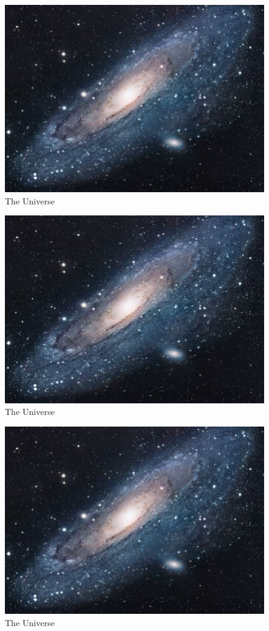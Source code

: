 \documentclass{article}
\begin{document}
\begin{figure}[h!]
\centering
\includegraphics[scale=1.7]{universe}
\caption{The Universe}
\label{fig:universe}
\end{figure}

\begin{figure}[h!]
\centering
\includegraphics[scale=1.7]{universe}
\caption{The Universe}
\label{fig:universe}
\end{figure}

\begin{figure}[h!]
\centering
\includegraphics[scale=1.7]{universe}
\caption{The Universe}
\label{fig:universe}
\end{figure}
\end{document}
